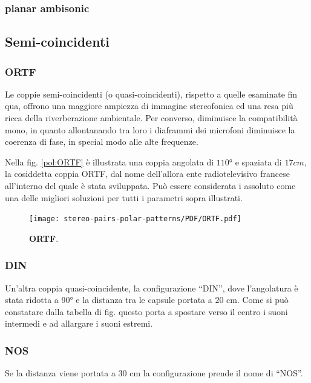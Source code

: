 \subsubsection*{planar ambisonic}
\subsection*{Semi-coincidenti}
\subsubsection*{ORTF}
Le coppie semi-coincidenti (o quasi-coincidenti), rispetto a quelle esaminate fin qua, offrono una
maggiore ampiezza di immagine stereofonica ed una resa più ricca della riverberazione
ambientale. Per converso, diminuisce la compatibilità mono, in quanto allontanando
tra loro i diaframmi dei microfoni diminuisce la coerenza di fase, in special
modo alle alte frequenze.

Nella fig. \ref{pol:ORTF}
è illustrata una coppia angolata di $110°$ e spaziata
di $17cm$, la cosiddetta coppia ORTF, dal nome dell’allora ente radiotelevisivo
francese all’interno del quale è stata sviluppata. Può essere considerata i
assoluto come una delle migliori soluzioni per tutti i parametri sopra illustrati.
\begin{figure}[h]
\begin{center}
\texttt{[image: stereo-pairs-polar-patterns/PDF/ORTF.pdf]}
\caption{\textbf{ORTF}.}
\label{ORTF}
\end{center}
\end{figure}
\subsubsection*{DIN}
Un’altra coppia quasi-coincidente, la configurazione “DIN”, dove l’angolatura
è stata ridotta a 90° e la distanza tra le capsule portata a 20 cm. Come si può
constatare dalla tabella di fig. %
questo porta a
spostare verso il centro i suoni intermedi e ad allargare i suoni estremi.
\subsubsection*{NOS}
Se la distanza viene portata a 30 cm la configurazione prende il nome di “NOS”.

